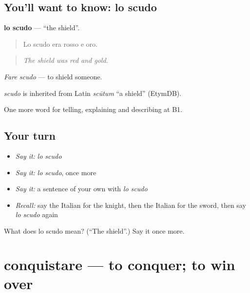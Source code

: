\subsection*{You'll want to know: lo scudo}
\textbf{lo scudo} — \textquotedblleft{}the shield\textquotedblright{}.

\begin{quote}
Lo scudo era rosso e oro.
\end{quote}

\begin{quote}
\emph{The shield was red and gold.}
\end{quote}

\emph{Fare scudo} — to shield someone.

\begin{cousinweb}
\emph{scudo} is inherited from Latin \emph{scūtum} \textquotedblleft{}a shield\textquotedblright{} (EtymDB).
\end{cousinweb}

\begin{grammarlens}[title={What you've built}]
One more word for telling, explaining and describing at B1.
\end{grammarlens}

\subsection*{Your turn}
\begin{itemize}
\raggedright
  \item \emph{Say it:} \emph{lo scudo}
  \item \emph{Say it:} \emph{lo scudo}, once more
  \item \emph{Say it:} a sentence of your own with \emph{lo scudo}
  \item \emph{Recall:} say the Italian for the knight, then the Italian for the sword, then say \emph{lo scudo} again
\end{itemize}

\begin{tcolorbox}[breakable,colback=teal!4,colframe=teal!35!black,title={Before you move on}]
What does lo scudo mean? (\textquotedblleft{}The shield\textquotedblright{}.) Say it once more.
\end{tcolorbox}
\section[conquistare]{conquistare — to conquer; to win over}

\label{lesson:IT-C327-conquistare}



